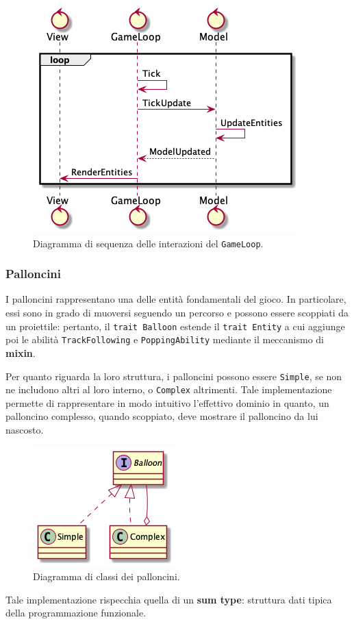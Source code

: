 \begin{figure}[H]
    \centering
    \includegraphics[width=.5\linewidth]{img/sequence-gameloop}
    \caption{Diagramma di sequenza delle interazioni del \texttt{GameLoop}.}
    \label{fig:sequence-gameloop}
\end{figure}

\subsubsection{Palloncini}
I palloncini rappresentano una delle entità fondamentali del gioco. In particolare, essi sono in grado di muoversi
seguendo un percorso e possono essere scoppiati da un proiettile: pertanto, il \texttt{trait Balloon} estende il
\texttt{trait Entity} a cui aggiunge poi le abilità \texttt{TrackFollowing} e \texttt{PoppingAbility} mediante il
meccanismo di \textbf{mixin}.

Per quanto riguarda la loro struttura, i palloncini possono essere \texttt{Simple}, se non ne includono altri al loro
interno, o \texttt{Complex} altrimenti. Tale implementazione permette di rappresentare in modo intuitivo l'effettivo
dominio in quanto, un palloncino complesso, quando scoppiato, deve mostrare il palloncino da lui nascosto.

\begin{figure}[H]
    \centering
    \includegraphics[width=.3\linewidth]{img/class-balloons}
    \caption{Diagramma di classi dei palloncini.}
    \label{fig:class-balloons}
\end{figure}

Tale implementazione rispecchia quella di un \textbf{sum type}: struttura dati tipica della programmazione funzionale.

